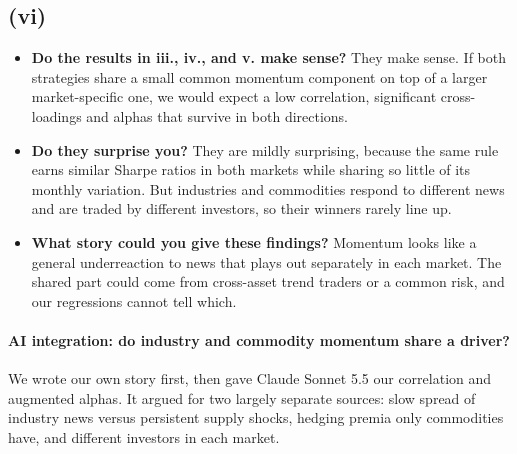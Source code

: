 \documentclass[11pt]{article}
\begin{document}
\subsection*{(vi)}

\begin{itemize}
\setlength{\itemsep}{4pt}\setlength{\parskip}{0pt}

\item \textbf{Do the results in iii., iv., and v. make sense?} They make sense. If both strategies share a small common momentum component on top of a larger market-specific one, we would expect a low correlation, significant cross-loadings and alphas that survive in both directions.

\item \textbf{Do they surprise you?} They are mildly surprising, because the same rule earns similar Sharpe ratios in both markets while sharing so little of its monthly variation. But industries and commodities respond to different news and are traded by different investors, so their winners rarely line up.

\item \textbf{What story could you give these findings?} Momentum looks like a general underreaction to news that plays out separately in each market. The shared part could come from cross-asset trend traders or a common risk, and our regressions cannot tell which.

\end{itemize}

\paragraph{AI integration: do industry and commodity momentum share a driver?} We wrote our own story first, then gave Claude Sonnet 5.5 our correlation and augmented alphas. It argued for two largely separate sources: slow spread of industry news versus persistent supply shocks, hedging premia only commodities have, and different investors in each market.
\end{document}
